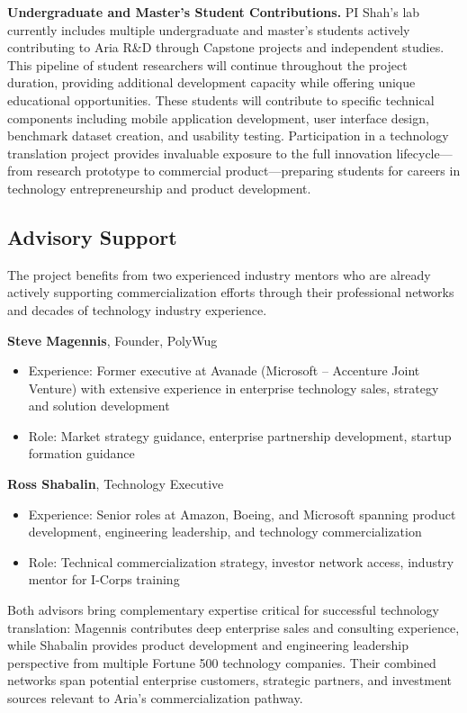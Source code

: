 \documentclass[11pt]{article}
\begin{document}
\noindent
\textbf{Undergraduate and Master's Student Contributions.}
PI Shah's lab currently includes multiple undergraduate and master's students actively contributing to Aria R\&D through Capstone projects and independent studies. This pipeline of student researchers will continue throughout the project duration, providing additional development capacity while offering unique educational opportunities. These students will contribute to specific technical components including mobile application development, user interface design, benchmark dataset creation, and usability testing. Participation in a technology translation project provides invaluable exposure to the full innovation lifecycle---from research prototype to commercial product---preparing students for careers in technology entrepreneurship and product development.

\subsection{Advisory Support}
\vspace*{-8pt}
The project benefits from two experienced industry mentors who are already actively supporting commercialization efforts through their professional networks and decades of technology industry experience.

\noindent
\textbf{Steve Magennis}, Founder, PolyWug
\begin{itemize}[noitemsep]
    \item Experience: Former executive at Avanade (Microsoft – Accenture Joint Venture) with extensive experience in enterprise technology sales, strategy and solution development
    \item Role: Market strategy guidance, enterprise partnership development, startup formation guidance
\end{itemize}

\noindent
\textbf{Ross Shabalin}, Technology Executive
\begin{itemize}[noitemsep]
    \item Experience: Senior roles at Amazon, Boeing, and Microsoft spanning product development, engineering leadership, and technology commercialization
    \item Role: Technical commercialization strategy, investor network access, industry mentor for I-Corps training
\end{itemize}

\noindent
Both advisors bring complementary expertise critical for successful technology translation: Magennis contributes deep enterprise sales and consulting experience, while Shabalin provides product development and engineering leadership perspective from multiple Fortune 500 technology companies. Their combined networks span potential enterprise customers, strategic partners, and investment sources relevant to Aria's commercialization pathway.
\end{document}
